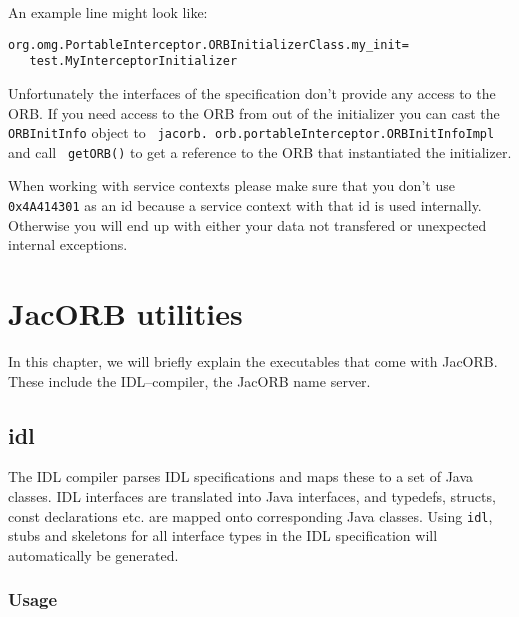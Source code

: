 \documentclass[12pt]{scrbook}
\begin{document}
An example line might look like:
\begin{verbatim}org.omg.PortableInterceptor.ORBInitializerClass.my_init=
   test.MyInterceptorInitializer
\end{verbatim}

Unfortunately the  interfaces of  the specification don't  provide any
access to  the ORB.  If  you need  access to the  ORB from out  of the
initializer  you  can  cast  the  {\tt  ORBInitInfo}  object  to  {\tt
jacorb. orb.portableInterceptor.ORBInitInfoImpl}   and   call  {\tt
getORB()}  to  get  a  reference  to the  ORB  that  instantiated  the
initializer.

When working with service contexts please make sure that you don't use {\tt
  0x4A414301} as an id because a service context with that id is used
internally.  Otherwise you will end up with either your data not transfered or
unexpected internal exceptions.




\chapter{JacORB utilities}

In this chapter, we will briefly explain the executables that come
with JacORB. These include the IDL--compiler, the JacORB name server.


\section{idl}

The IDL compiler parses IDL specifications  and maps these to a set of
Java classes. IDL interfaces  are translated into Java interfaces, and
typedefs,   structs,   const  declarations   etc.   are  mapped   onto
corresponding Java  classes.  Using {\tt idl},  stubs and
skeletons  for  all interface  types  in  the  IDL specification  will
automatically be generated.

\subsection*{Usage}

\end{document}
